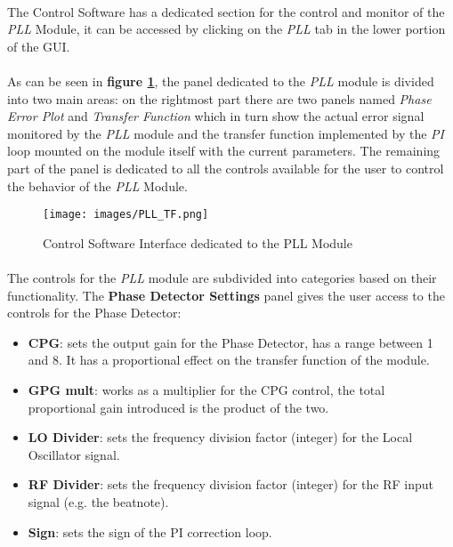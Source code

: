 \paragraph{}The \QubeModel  Control Software has a dedicated section for the control and monitor of the \textit{PLL} Module, it can be accessed by clicking on the \textit{PLL} tab in the lower portion of the GUI.
\paragraph{}As can be seen in \textbf{figure \ref{PLL_SW_interface}}, the panel dedicated to the \textit{PLL} module is divided into two main areas: on the rightmost part there are two panels named \textit{Phase Error Plot} and \textit{Transfer Function} which in turn show the actual error signal monitored by the \textit{PLL} module and the transfer function implemented by the \textit{PI} loop mounted on the module itself with the current parameters. The remaining part of the panel is dedicated to all the controls available for the user to control the behavior of the \textit{PLL} Module.

\begin{figure}[h]
    \centering
    \texttt{[image: images/PLL\_TF.png]}
    \caption{Control Software Interface dedicated to the PLL Module}
    \label{PLL_SW_interface}
\end{figure}

\paragraph{} The controls for the \textit{PLL} module are subdivided into categories based on their functionality.
\newline The \textbf{Phase Detector Settings} panel gives the user access to the controls for the Phase Detector:
\begin{itemize}
    \item \textbf{CPG}: sets the output gain for the Phase Detector, has a range between 1 and 8. It has a proportional effect on the transfer function of the module.
    
    \item \textbf{GPG mult}: works as a multiplier for the CPG control, the total proportional gain introduced is the product of the two.
    
    \item \textbf{LO Divider}: sets the frequency division factor (integer) for the Local Oscillator signal.
    
    \item \textbf{RF Divider}: sets the frequency division factor (integer) for the RF input signal (e.g. the beatnote).
    
    \item \textbf{Sign}: sets the sign of the PI correction loop.
\end{itemize}

